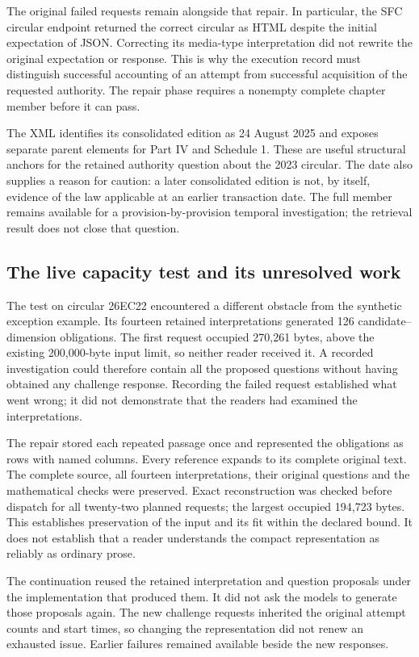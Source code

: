 The original failed requests remain alongside that repair. In particular, the
SFC circular endpoint returned the correct circular as HTML despite the initial
expectation of JSON. Correcting its media-type interpretation did not rewrite
the original expectation or response. This is why the execution record must
distinguish successful accounting of an attempt from successful acquisition of
the requested authority. The repair phase requires a nonempty complete chapter
member before it can pass.

The XML identifies its consolidated edition as 24 August 2025 and exposes
separate parent elements for Part IV and Schedule 1. These are useful structural
anchors for the retained authority question about the 2023 circular. The date
also supplies a reason for caution: a later consolidated edition is not, by
itself, evidence of the law applicable at an earlier transaction date. The full
member remains available for a provision-by-provision temporal investigation;
the retrieval result does not close that question.

\subsection{The live capacity test and its unresolved work}

The test on circular 26EC22 encountered a different obstacle from the synthetic
exception example. Its fourteen retained interpretations generated 126
candidate--dimension obligations. The first request occupied 270,261 bytes,
above the existing 200,000-byte input limit, so neither reader received it.
A recorded investigation could therefore contain all the proposed questions
without having obtained any challenge response. Recording the failed request
established what went wrong; it did not demonstrate that the readers had
examined the interpretations.

The repair stored each repeated passage once and represented the obligations
as rows with named columns. Every reference expands to its complete original
text. The complete source, all fourteen interpretations, their original
questions and the mathematical checks were preserved. Exact reconstruction
was checked before dispatch for all twenty-two planned requests; the largest
occupied 194,723 bytes. This establishes preservation of the input and its
fit within the declared bound. It does not establish that a reader understands
the compact representation as reliably as ordinary prose.

The continuation reused the retained interpretation and question proposals
under the implementation that produced them. It did not ask the models to
generate those proposals again. The new challenge requests inherited the
original attempt counts and start times, so changing the representation did
not renew an exhausted issue. Earlier failures remained available beside the
new responses.

